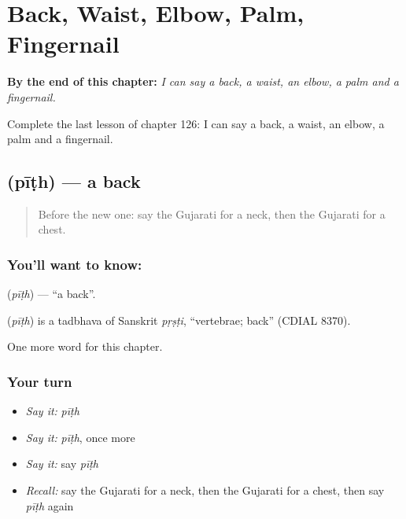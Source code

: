 
\chapter{Back, Waist, Elbow, Palm, Fingernail}
\label{ch:gu-back-waist-elbow-palm-fingernail}

\begin{chapteropening}
\textbf{By the end of this chapter:} \emph{I can say a back, a waist, an elbow, a palm and a fingernail.}

Complete the last lesson of chapter 126: I can say a back, a waist, an elbow, a palm and a fingernail.
\end{chapteropening}

\section[\texorpdfstring{\gu{પીઠ} (pīṭh)}{પીઠ (pīṭh)}]{ (pīṭh) — a back}

\label{lesson:GU-C126-pith}



\begin{quote}
Before the new one: say the Gujarati for a neck, then the Gujarati for a chest.
\end{quote}

\subsection*{You'll want to know: }
\textbf{} (\emph{pīṭh}) — \textquotedblleft{}a back\textquotedblright{}.

\begin{cousinweb}
\textbf{} (\emph{pīṭh}) is a tadbhava of Sanskrit \emph{pṛṣṭi}, \textquotedblleft{}vertebrae; back\textquotedblright{} (CDIAL 8370).
\end{cousinweb}

\begin{grammarlens}[title={What you've built}]
One more word for this chapter.
\end{grammarlens}

\subsection*{Your turn}
\begin{itemize}
\raggedright
  \item \emph{Say it:} \emph{pīṭh}
  \item \emph{Say it:} \emph{pīṭh}, once more
  \item \emph{Say it:} say \emph{pīṭh}
  \item \emph{Recall:} say the Gujarati for a neck, then the Gujarati for a chest, then say \emph{pīṭh} again
\end{itemize}

